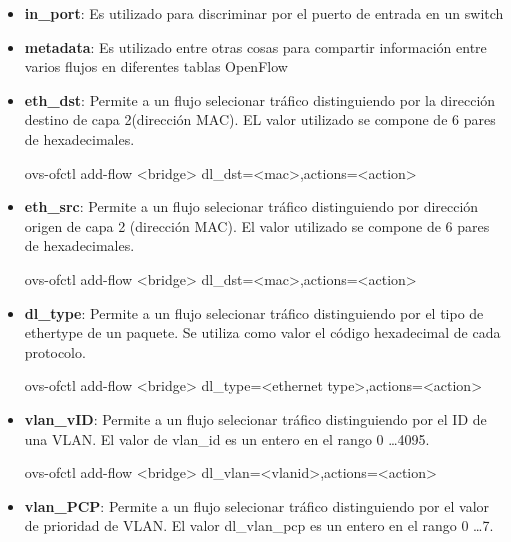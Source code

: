 \begin{itemize}

\item \textbf{in\_port}: Es utilizado para discriminar por el puerto de entrada en un switch

\item \textbf{metadata}: Es utilizado entre otras cosas para compartir informaci\'on entre varios flujos en diferentes tablas OpenFlow

\item \textbf{eth\_dst}: Permite a un flujo selecionar tr\'afico distinguiendo por la direcci\'on destino de capa 2(dirección MAC). EL valor utilizado se compone de 6 pares de hexadecimales.

\begin{center}
ovs-ofctl add-flow <bridge> dl\_dst=<mac>,actions=<action>
\end{center}

\item \textbf{eth\_src}: Permite a un flujo selecionar tr\'afico distinguiendo por direcci\'on origen de capa 2 (direcci\'on MAC). El valor utilizado se compone de 6 pares de hexadecimales.

\begin{center}
ovs-ofctl add-flow <bridge> dl\_dst=<mac>,actions=<action>
\end{center}

\item \textbf{dl\_type}: Permite a un flujo selecionar tr\'afico distinguiendo por el tipo de ethertype de un paquete. Se utiliza como valor el c\'odigo hexadecimal de cada protocolo.

\begin{center}
ovs-ofctl add-flow <bridge> dl\_type=<ethernet type>,actions=<action>
\end{center}

\item \textbf{vlan\_vID}: Permite a un flujo selecionar tr\'afico distinguiendo por el ID de una VLAN. El valor de vlan\_id es un entero en el rango 0 \dots 4095.

\begin{center}
ovs-ofctl add-flow <bridge> dl\_vlan=<vlanid>,actions=<action>
\end{center}

\item \textbf{vlan\_PCP}: Permite a un flujo selecionar tr\'afico distinguiendo por el valor de prioridad de VLAN. El valor dl\_vlan\_pcp es un entero en el rango 0 \dots 7.


\end{itemize}
